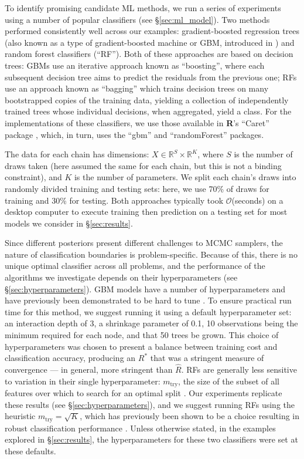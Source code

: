 \documentclass[ba]{imsart}
\numberwithin{equation}{section}
\theoremstyle{plain}
\begin{document}
To identify promising candidate ML methods, we run a series of experiments using a number of popular classifiers (see \S\ref{sec:ml_model}). Two methods performed consistently well across our examples: gradient-boosted regression trees (also known as a type of gradient-boosted machine or GBM, introduced in \cite{friedman2001greedy}) and random forest classifiers \citep{breiman2001random} (``RF''). Both of these approaches are based on decision trees: GBMs use an iterative approach known as ``boosting'', where each subsequent decision tree aims to predict the residuals from the previous one; RFs use an approach known as ``bagging'' which trains decision trees on many bootstrapped copies of the training data, yielding a collection of independently trained trees whose individual decisions, when aggregated, yield a class. For the implementations of these classifiers, we use those available in \textbf{\textsf{R}}'s ``Caret'' package \citep{kuhn2008building}, which, in turn, uses the ``gbm'' \citep{greenwell2019package} and ``randomForest'' \citep{liaw2002classification} packages.

The data for each chain has dimensions: $X\in \mathbb{R}^{S}\times \mathbb{R}^{K}$, where $S$ is the number of draws taken (here assumed the same for each chain, but this is not a binding constraint), and $K$ is the number of parameters. We split each chain's draws into randomly divided training and testing sets: here, we use 70\% of draws for training and 30\% for testing. Both approaches typically took $\mathcal{O}$(seconds) on a desktop computer to execute training then prediction on a testing set for most models we consider in \S\ref{sec:results}.

Since different posteriors present different challenges to MCMC samplers, the nature of classification boundaries is problem-specific. Because of this, there is no unique optimal classifier across all problems, and the performance of the algorithms we investigate depends on their hyperparameters (see \S\ref{sec:hyperparameters}). GBM models have a number of hyperparameters and have previously been demonstrated to be hard to tune \cite[Chapter~12]{boehmke2019hands}. To ensure practical run time for this method, we suggest running it using a default hyperparameter set: an interaction depth of 3, a shrinkage parameter of 0.1, 10 observations being the minimum required for each node, and that 50 trees be grown. This choice of hyperparameters was chosen to present a balance between training cost and classification accuracy, producing an $R^*$  that was a stringent measure of convergence — in general, more stringent than $\widehat{R}$. RFs are generally less sensitive to variation in their single hyperparameter: $m_{\text{try}}$, the size of the subset of all features over which to search for an optimal split \cite[Chapter~11]{boehmke2019hands}. Our experiments replicate these results (see \S\ref{sec:hyperparameters}), and we suggest running RFs using the heuristic $m_{\text{try}}=\sqrt{K}$, which has previously been shown to be a choice resulting in robust classification performance \citep{bernard2009influence,boehmke2019hands}. Unless otherwise stated, in the examples explored in \S\ref{sec:results}, the hyperparameters for these two classifiers were set at these defaults.
\end{document}
